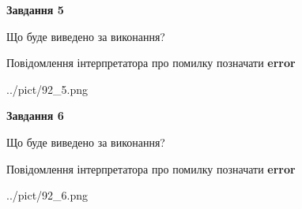 \documentclass[12pt, ukrainian]{article}
\begin{document}
{{\begin {center}\textbf{Завдання 5}\end {center}}\par
Що буде виведено за виконання? \par
Повідомлення інтерпретатора про помилку позначати \textbf{error}

\begin{center}
	{../pict/92_5.png}
\end{center}
\newpage

{\begin {center}\textbf{Завдання 6}\end {center}}\par
Що буде виведено за виконання? \par
Повідомлення інтерпретатора про помилку позначати \textbf{error}

\begin{center}
	{../pict/92_6.png}
\end{center}
\newpage

}
\end{document}
